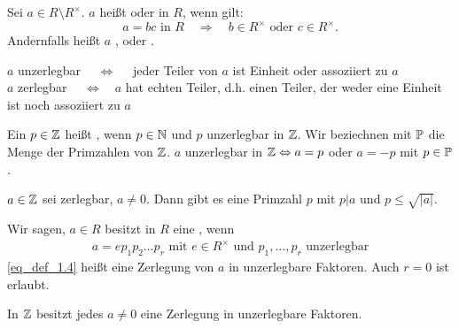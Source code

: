 \setlength{\fboxsep}{10pt}
\setlength{\fboxrule}{3pt}
\begin{center}
\end{center}

\begin{defn} \label{def_1.3}
	Sei $a \in R \setminus R^\times$. $a$ heißt  oder  in $R$, wenn gilt:
	\[ a = bc \text{ in } R \quad \Rightarrow \quad b \in R^\times \text{ oder } c \in R^\times. \]
	Andernfalls heißt $a$ ,  oder .
\end{defn}

	$a$ unzerlegbar $\quad \Leftrightarrow \quad $ jeder Teiler von $a$ ist Einheit oder assoziiert zu $a$ \\
	$a$ zerlegbar $\quad \Leftrightarrow \quad a$ hat echten Teiler, d.h. einen Teiler, der weder eine Einheit ist noch assoziiert zu $a$

\setcounter{countdef}{2}
\begin{defn}[Primzahl] \label{def_1.3'}
	Ein $p \in \mathbb{Z}$ heißt , wenn $p \in \mathbb{N}$ und $p$ unzerlegbar in $\mathbb{Z}$. Wir beziechnen mit $\mathbb{P}$ die Menge der Primzahlen von $\mathbb{Z}$. $a$ unzerlegbar in $\mathbb{Z} \Leftrightarrow a = p$ oder $a = -p$ mit $p \in \mathbb{P}$.
\end{defn}

	$a \in \mathbb{Z}$ sei zerlegbar, $a \neq 0$. Dann gibt es eine Primzahl $p$ mit $p | a$ und $p \leq \sqrt{|a|}$.

\begin{defn} \label{def_1.4}
	Wir sagen, $a \in R$ besitzt in $R$ eine , wenn
	\begin{equation}
	\begin{aligned}
		a = ep_1p_2\dots p_r \text{ mit } e \in R^\times \text{ und } p_1,\dots,p_r \text{ unzerlegbar} \label{eq_def_1.4}
	\end{aligned}
	\end{equation}
	\eqref{eq_def_1.4} heißt eine Zerlegung von $a$ in unzerlegbare Faktoren. Auch $r = 0$ ist erlaubt.
\end{defn}

\begin{falko} \label{F1.3}
	In $\mathbb{Z}$ besitzt jedes $a \neq 0$ eine Zerlegung in unzerlegbare Faktoren.
\end{falko}	

